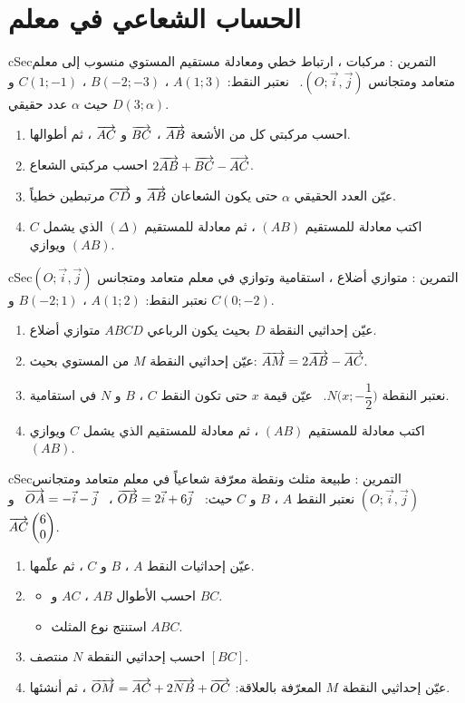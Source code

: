 \documentclass[12pt,a4paper]{article}
\newenvironment{BOX}[2]{\begin{otherlanguage}{english}\begin{arbox}{#1}{#2}}{\end{arbox}\end{otherlanguage}}
\newcounter{exo}
\newenvironment{tamrin}[1]{\stepcounter{exo}\begin{BOX}{cSec}{التمرين \theexo: #1}}{\end{BOX}}
\newenvironment{sq}{\begin{itemize}[leftmargin=2.4em,itemsep=3pt]}{\end{itemize}}
\newcommand{\qa}{\item[(أ)]}\newcommand{\qb}{\item[(ب)]}\newcommand{\qc}{\item[(جـ)]}\newcommand{\qd}{\item[(د)]}\newcommand{\qe}{\item[(هـ)]}
\begin{document}
\section{الحساب الشعاعي في معلم}
\begin{tamrin}{مركبات ، ارتباط خطي ومعادلة مستقيم}
المستوي منسوب إلى معلم متعامد ومتجانس $(O;\vec i,\vec j)$. \ نعتبر النقط: $A(1;3)$ ، $B(-2;-3)$ ، $C(1;-1)$ و $D(3;\alpha)$ حيث $\alpha$ عدد حقيقي.
\begin{enumerate}
\item احسب مركبتي كل من الأشعة $\overrightarrow{AB}$ ، $\overrightarrow{BC}$ و $\overrightarrow{AC}$ ، ثم أطوالها.
\item احسب مركبتي الشعاع $2\overrightarrow{AB}+\overrightarrow{BC}-\overrightarrow{AC}$.
\item عيّن العدد الحقيقي $\alpha$ حتى يكون الشعاعان $\overrightarrow{AB}$ و $\overrightarrow{CD}$ مرتبطين خطياً.
\item اكتب معادلة للمستقيم $(AB)$ ، ثم معادلة للمستقيم $(\Delta)$ الذي يشمل $C$ ويوازي $(AB)$.
\end{enumerate}
\end{tamrin}

\begin{tamrin}{متوازي أضلاع ، استقامية وتوازي}
في معلم متعامد ومتجانس $(O;\vec i,\vec j)$ نعتبر النقط: $A(1;2)$ ، $B(-2;1)$ و $C(0;-2)$.
\begin{enumerate}
\item عيّن إحداثيي النقطة $D$ بحيث يكون الرباعي $ABCD$ متوازي أضلاع.
\item عيّن إحداثيي النقطة $M$ من المستوي بحيث: $\overrightarrow{AM}=2\overrightarrow{AB}-\overrightarrow{AC}$.
\item نعتبر النقطة $N\Big(x;-\dfrac12\Big)$. \ عيّن قيمة $x$ حتى تكون النقط $C$ ، $B$ و $N$ في استقامية.
\item اكتب معادلة للمستقيم $(AB)$ ، ثم معادلة للمستقيم الذي يشمل $C$ ويوازي $(AB)$.
\end{enumerate}
\end{tamrin}

\begin{tamrin}{طبيعة مثلث ونقطة معرّفة شعاعياً}
في معلم متعامد ومتجانس $(O;\vec i,\vec j)$ نعتبر النقط $A$ ، $B$ و $C$ حيث: \ $\overrightarrow{OB}=2\vec i+6\vec j$ ، \ $\overrightarrow{OA}=-\vec i-\vec j$ \ و \ $\overrightarrow{AC}\begin{pmatrix}6\\0\end{pmatrix}$.
\begin{enumerate}
\item عيّن إحداثيات النقط $A$ ، $B$ و $C$ ، ثم علّمها.
\item
\begin{sq}
\qa احسب الأطوال $AB$ ، $AC$ و $BC$.
\qb استنتج نوع المثلث $ABC$.
\end{sq}
\item احسب إحداثيي النقطة $N$ منتصف $[BC]$.
\item عيّن إحداثيي النقطة $M$ المعرّفة بالعلاقة: $\overrightarrow{OM}=\overrightarrow{AC}+2\overrightarrow{NB}+\overrightarrow{OC}$ ، ثم أنشئها.
\end{enumerate}
\end{tamrin}
\end{document}

